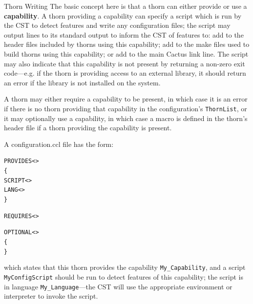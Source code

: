 \begin{cactuspart}{Thorn Writing}
The basic concept here is that a thorn can either provide or use a
{\bf capability}.  A thorn providing a capability can specify a script
which is run by the CST to detect features and write any configuration
files;  the script may output lines to its standard output to inform
the CST of features to: add to the header files included by thorns
using this capability; add to the make files used to build thorns
using this capability; or add to the main Cactus link line.  The script
may also indicate that this capability is not present by returning a
non-zero exit code---e.g. if the thorn is providing access to an
external library, it should return an error if the library is not
installed on the system.

A thorn may either require a capability to be present, in which case
it is an error if there is no thorn providing that capability in the
configuration's \texttt{ThornList}, or it may optionally use a capability, in
which case a macro is defined in the thorn's header file if a thorn
providing the capability is present.

A configuration.ccl file has the form:

\begin{alltt}
PROVIDES <>
\{
  SCRIPT <>
  LANG <>
\}

REQUIRES  <>

OPTIONAL <>
\{
\}

\end{alltt}

which states that this thorn provides the capability
\verb|My_Capability|, and a script \verb|MyConfigScript| should be run
to detect features of this capability; the script is in language
\verb|My_Language|---the CST will use the appropriate environment or
interpreter to invoke the script.

% 
% 
% 
% 
% 
% 
% 
% 


\end{cactuspart}
